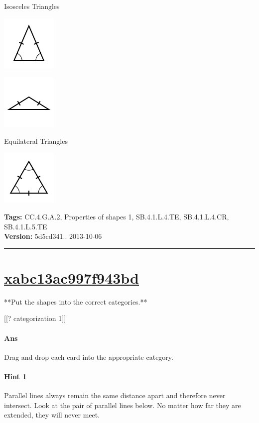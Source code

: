 \documentclass[twocolumn,10pt]{article}
\def\shrinkfactor{0.55}
\begin{document}
Isosceles Triangles


\includegraphics[scale=\shrinkfactor]{figures/dc310510e56d5d165e56b2b2a168163c503fe100.png}


\includegraphics[scale=\shrinkfactor]{figures/ab33a8ea9f6040b7277f725f46c6d9452ab8fbbc.png}

Equilateral Triangles


\includegraphics[scale=\shrinkfactor]{figures/2e6355867a1027528f1719f9dcb578dcb221b055.png}



\medskip
\noindent
\textbf{Tags:} {\footnotesize CC.4.G.A.2, Properties of shapes 1, SB.4.1.L.4.TE, SB.4.1.L.4.CR, SB.4.1.L.5.TE}\\
\textbf{Version:} 5d5cd341.. 2013-10-06
\smallskip\hrule





\section{\href{https://www.khanacademy.org/devadmin/content/items/xabc13ac997f943bd}{xabc13ac997f943bd}}

\noindent
**Put the shapes into the correct categories.**

[[? categorization 1]]


\paragraph{Ans} Drag and drop each card into the appropriate category. 

\paragraph{Hint 1}Parallel lines always remain the same distance apart and therefore never intersect.  Look at the pair of parallel lines below.  No matter how far they are extended, they will never meet.
\end{document}

